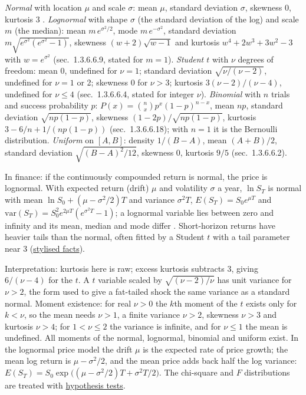 \begin{qfdefinition}\label{def:financial-distributions}
 \emph{Normal} with location $\mu$ and scale $\sigma$: mean $\mu$, standard deviation $\sigma$, skewness 0, kurtosis 3 \citep[sec.~1.3.6.6.1]{statistical-methods-handbook}. \emph{Lognormal} with shape $\sigma$ (the standard deviation of the log) and scale $m$ (the median): mean $m\,e^{\sigma^2/2}$, mode $m\,e^{-\sigma^2}$, standard deviation $m\sqrt{e^{\sigma^2}(e^{\sigma^2}-1)}$, skewness $(w+2)\sqrt{w-1}$ and kurtosis $w^4+2w^3+3w^2-3$ with $w=e^{\sigma^2}$ (sec.~1.3.6.6.9, stated for $m=1$). \emph{Student $t$} with $\nu$ degrees of freedom: mean 0, undefined for $\nu=1$; standard deviation $\sqrt{\nu/(\nu-2)}$, undefined for $\nu=1$ or 2; skewness 0 for $\nu>3$; kurtosis $3(\nu-2)/(\nu-4)$, undefined for $\nu\le4$ (sec.~1.3.6.6.4, stated for integer $\nu$). \emph{Binomial} with $n$ trials and success probability $p$: $P(x)=\binom nx p^x(1-p)^{n-x}$, mean $np$, standard deviation $\sqrt{np(1-p)}$, skewness $(1-2p)/\sqrt{np(1-p)}$, kurtosis $3-6/n+1/(np(1-p))$ (sec.~1.3.6.6.18); with $n=1$ it is the Bernoulli distribution. \emph{Uniform} on $[A,B]$: density $1/(B-A)$, mean $(A+B)/2$, standard deviation $\sqrt{(B-A)^2/12}$, skewness 0, kurtosis $9/5$ (sec.~1.3.6.6.2).

In finance: if the continuously compounded return is normal, the price is lognormal. With expected return (drift) $\mu$ and volatility $\sigma$ a year, $\ln S_T$ is normal with mean $\ln S_0+(\mu-\sigma^2/2)T$ and variance $\sigma^2T$, $E(S_T)=S_0e^{\mu T}$ and $\mathrm{var}(S_T)=S_0^2e^{2\mu T}(e^{\sigma^2T}-1)$; a lognormal variable lies between zero and infinity and its mean, median and mode differ \citep[chap.~15, sec.~15.1, pp.~339--340]{s7-hulloptions}. Short-horizon returns have heavier tails than the normal, often fitted by a Student $t$ with a tail parameter near 3 (\hyperref[ev:high-frequency-stylised-facts]{stylised facts}).

 Interpretation: kurtosis here is raw; excess kurtosis subtracts 3, giving $6/(\nu-4)$ for the $t$. A $t$ variable scaled by $\sqrt{(\nu-2)/\nu}$ has unit variance for $\nu>2$, the form used to give a fat-tailed shock the same variance as a standard normal. Moment existence: for real $\nu>0$ the $k$th moment of the $t$ exists only for $k<\nu$, so the mean needs $\nu>1$, a finite variance $\nu>2$, skewness $\nu>3$ and kurtosis $\nu>4$; for $1<\nu\le2$ the variance is infinite, and for $\nu\le1$ the mean is undefined. All moments of the normal, lognormal, binomial and uniform exist. In the lognormal price model the drift $\mu$ is the expected rate of price growth; the mean log return is $\mu-\sigma^2/2$, and the mean price adds back half the log variance: $E(S_T)=S_0\exp\bigl((\mu-\sigma^2/2)T+\sigma^2T/2\bigr)$. The chi-square and $F$ distributions are treated with \hyperref[meth:hypothesis-testing]{hypothesis tests}.


\end{qfdefinition}

